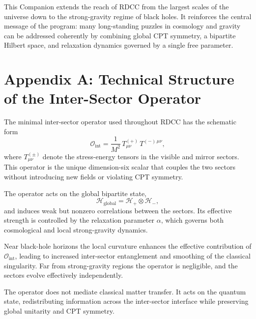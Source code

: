 \documentclass[11pt,a4paper]{article}
\begin{document}
This Companion extends the reach of RDCC from the largest scales of the universe down
to the strong-gravity regime of black holes. It reinforces the central message of the
program: many long-standing puzzles in cosmology and gravity can be addressed
coherently by combining global CPT symmetry, a bipartite Hilbert space, and relaxation
dynamics governed by a single free parameter.


\appendix

\section*{Appendix A: Technical Structure of the Inter-Sector Operator}

The minimal inter-sector operator used throughout RDCC has the schematic form
\begin{equation}
\mathcal{O}_{\mathrm{int}}
=
\frac{1}{M^{2}}
\,T^{(+)}_{\mu\nu}\,T^{(-)\,\mu\nu},
\end{equation}
where $T^{(\pm)}_{\mu\nu}$ denote the stress-energy tensors in the visible and mirror
sectors. This operator is the unique dimension-six scalar that couples the two sectors
without introducing new fields or violating CPT symmetry.

The operator acts on the global bipartite state,
\begin{equation}
\mathcal{H}_{\mathrm{global}}
=
\mathcal{H}_{+}\otimes\mathcal{H}_{-},
\end{equation}
and induces weak but nonzero correlations between the sectors. Its effective strength is
controlled by the relaxation parameter $\alpha$, which governs both cosmological and
local strong-gravity dynamics.

Near black-hole horizons the local curvature enhances the effective contribution of
$\mathcal{O}_{\mathrm{int}}$, leading to increased inter-sector entanglement and smoothing of
the classical singularity. Far from strong-gravity regions the operator is negligible, and
the sectors evolve effectively independently.

The operator does not mediate classical matter transfer. It acts on the quantum state,
redistributing information across the inter-sector interface while preserving global
unitarity and CPT symmetry.
\end{document}
